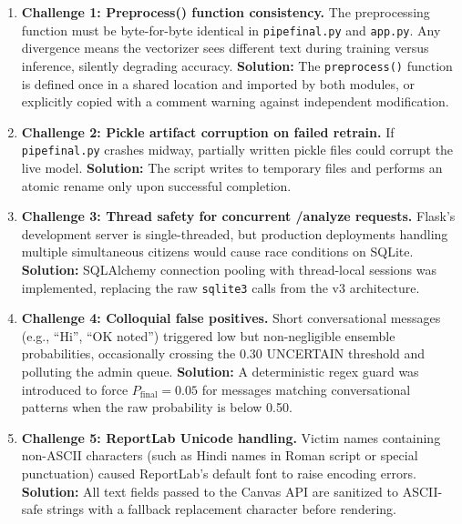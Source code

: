 \begin{enumerate}
    \item \textbf{Challenge 1: Preprocess() function consistency.} The preprocessing function must be byte-for-byte identical in \texttt{pipefinal.py} and \texttt{app.py}. Any divergence means the vectorizer sees different text during training versus inference, silently degrading accuracy. \textbf{Solution:} The \texttt{preprocess()} function is defined once in a shared location and imported by both modules, or explicitly copied with a comment warning against independent modification.
    
    \item \textbf{Challenge 2: Pickle artifact corruption on failed retrain.} If \texttt{pipefinal.py} crashes midway, partially written pickle files could corrupt the live model. \textbf{Solution:} The script writes to temporary files and performs an atomic rename only upon successful completion.
    
    \item \textbf{Challenge 3: Thread safety for concurrent /analyze requests.} Flask's development server is single-threaded, but production deployments handling multiple simultaneous citizens would cause race conditions on SQLite. \textbf{Solution:} SQLAlchemy connection pooling with thread-local sessions was implemented, replacing the raw \texttt{sqlite3} calls from the v3 architecture.
    
    \item \textbf{Challenge 4: Colloquial false positives.} Short conversational messages (e.g., ``Hi'', ``OK noted'') triggered low but non-negligible ensemble probabilities, occasionally crossing the 0.30 UNCERTAIN threshold and polluting the admin queue. \textbf{Solution:} A deterministic regex guard was introduced to force $P_{\text{final}} = 0.05$ for messages matching conversational patterns when the raw probability is below 0.50.
    
    \item \textbf{Challenge 5: ReportLab Unicode handling.} Victim names containing non-ASCII characters (such as Hindi names in Roman script or special punctuation) caused ReportLab's default font to raise encoding errors. \textbf{Solution:} All text fields passed to the Canvas API are sanitized to ASCII-safe strings with a fallback replacement character before rendering.
\end{enumerate}
